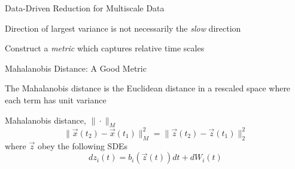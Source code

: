 \documentclass[12pt]{beamer}
\begin{document}
\begin{frame}{Data-Driven Reduction for Multiscale Data}

{\small Direction of largest variance is not necessarily the {\em slow} direction}

\begin{center}
\end{center}

Construct a {\em metric} which captures relative time scales 

\end{frame}

\begin{frame}{Mahalanobis Distance: A Good Metric}

\centering
The Mahalanobis distance is the Euclidean distance in a rescaled space where each term has unit variance

\begin{block}{Mahalanobis distance, $\| \cdot \|_M$}
$$\| \vec{x}(t_2) - \vec{x}(t_1) \|^2_M = \| \vec{z}(t_2) - \vec{z}(t_1) \|^2_2$$
where $\vec{z}$ obey the following SDEs
$$dz_i(t) = b_i(\vec{z}(t)) dt + dW_i(t)$$
\end{block}

\end{frame}
\end{document}
